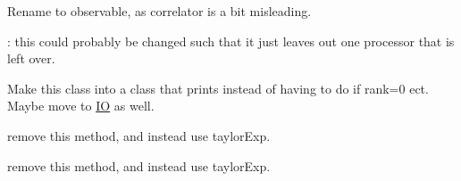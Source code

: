 
\begin{DoxyRefList}
\item[Class \mbox{\hyperlink{class_correlator}{Correlator}} ]\label{todo__todo000004}%
%
Rename to observable, as correlator is a bit misleading. 
\item[Global \mbox{\hyperlink{class_parallel_1_1_communicator_acd7e2f114728e5207093743a58ab3a40}{Parallel::Communicator::check\+Processor\+Validity}} ()]\label{todo__todo000005}%
%
\+: this could probably be changed such that it just leaves out one processor that is left over.  
\item[Class \mbox{\hyperlink{class_sys_print}{Sys\+Print}} ]\label{todo__todo000001}%
%
Make this class into a class that prints instead of having to do if rank=0 ect. Maybe move to \mbox{\hyperlink{namespace_i_o}{IO}} as well. 
\item[Class \mbox{\hyperlink{class_taylor2_exp}{Taylor2\+Exp}} ]\label{todo__todo000002}%
%
remove this method, and instead use taylor\+Exp. 
\item[Class \mbox{\hyperlink{class_taylor4_exp}{Taylor4\+Exp}} ]\label{todo__todo000003}%
%
remove this method, and instead use taylor\+Exp.
\end{DoxyRefList}